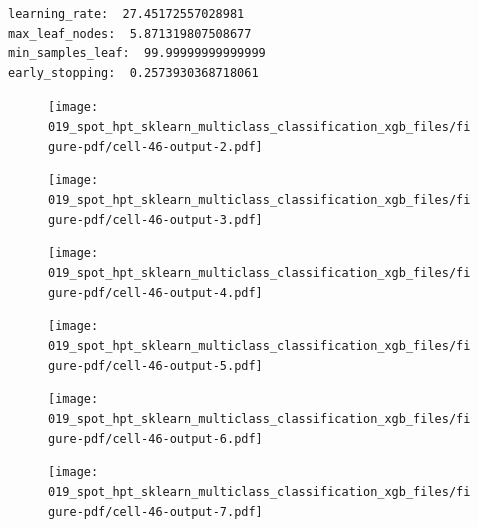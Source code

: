\documentclass[
  letterpaper,
  DIV=11,
  numbers=noendperiod]{scrreprt}
\begin{document}
\begin{verbatim}
learning_rate:  27.45172557028981
max_leaf_nodes:  5.871319807508677
min_samples_leaf:  99.99999999999999
early_stopping:  0.2573930368718061
\end{verbatim}

\begin{figure}[H]

{\centering \texttt{[image: 019\_spot\_hpt\_sklearn\_multiclass\_classification\_xgb\_files/figure-pdf/cell-46-output-2.pdf]}

}

\end{figure}

\begin{figure}[H]

{\centering \texttt{[image: 019\_spot\_hpt\_sklearn\_multiclass\_classification\_xgb\_files/figure-pdf/cell-46-output-3.pdf]}

}

\end{figure}

\begin{figure}[H]

{\centering \texttt{[image: 019\_spot\_hpt\_sklearn\_multiclass\_classification\_xgb\_files/figure-pdf/cell-46-output-4.pdf]}

}

\end{figure}

\begin{figure}[H]

{\centering \texttt{[image: 019\_spot\_hpt\_sklearn\_multiclass\_classification\_xgb\_files/figure-pdf/cell-46-output-5.pdf]}

}

\end{figure}

\begin{figure}[H]

{\centering \texttt{[image: 019\_spot\_hpt\_sklearn\_multiclass\_classification\_xgb\_files/figure-pdf/cell-46-output-6.pdf]}

}

\end{figure}

\begin{figure}[H]

{\centering \texttt{[image: 019\_spot\_hpt\_sklearn\_multiclass\_classification\_xgb\_files/figure-pdf/cell-46-output-7.pdf]}

}

\end{figure}
\end{document}
